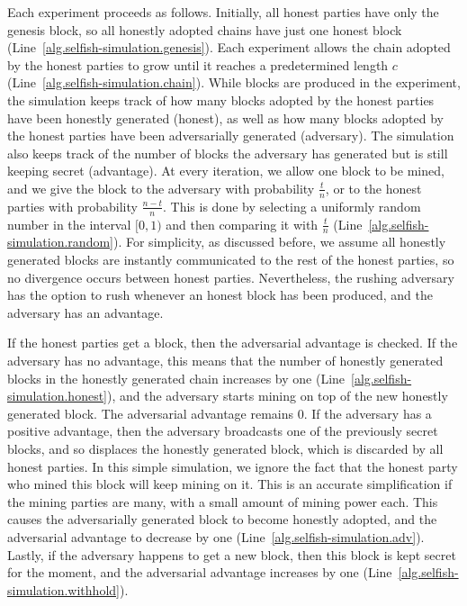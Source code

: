 Each experiment proceeds as follows.
Initially, all honest parties have
only the genesis block, so all honestly adopted chains have just one honest
block (Line~\ref{alg.selfish-simulation.genesis}). Each experiment allows the chain
adopted by the honest parties to grow until it reaches a predetermined length $c$
(Line~\ref{alg.selfish-simulation.chain}). While blocks are produced in the experiment,
the simulation keeps track of how many blocks adopted by the honest parties have
been honestly generated (\textsf{honest}), as well as how many blocks adopted by the honest parties
have been adversarially generated (\textsf{adversary}). The simulation also keeps track
of the number of blocks the adversary has generated but is still keeping secret (\textsf{advantage}).
At every iteration, we allow one block to be mined, and we give the block to
the adversary with probability $\frac{t}{n}$, or to the honest parties with
probability $\frac{n - t}{n}$. This is done by selecting a uniformly random
number in the interval $[0, 1)$ and then comparing it with $\frac{t}{n}$ (Line~\ref{alg.selfish-simulation.random}).
For simplicity, as discussed before, we assume
all honestly generated blocks are instantly communicated to the rest of the honest
parties, so no divergence occurs between honest parties. Nevertheless, the rushing adversary
has the option to rush whenever an honest block has been produced, and the adversary has
an advantage.

If the honest parties get a block, then the adversarial advantage is checked.
If the adversary has no advantage, this means that the number of honestly generated
blocks in the honestly generated chain increases by one (Line~\ref{alg.selfish-simulation.honest}),
and the adversary starts
mining on top of the new honestly generated block. The adversarial advantage remains $0$.
If the adversary has a positive advantage, then the adversary broadcasts one of the previously
secret blocks, and so displaces the honestly generated block, which is discarded by
all honest parties. In this simple simulation, we ignore the fact that the honest party
who mined this block will keep mining on it. This is an accurate simplification if the
mining parties are many, with a small amount of mining power each. This causes the
adversarially generated block to become honestly adopted, and the adversarial advantage
to decrease by one (Line~\ref{alg.selfish-simulation.adv}). Lastly, if the adversary
happens to get a new block, then this block is kept secret for the moment, and the
adversarial advantage increases by one (Line~\ref{alg.selfish-simulation.withhold}).

